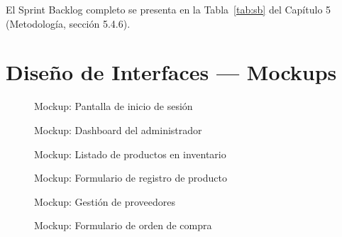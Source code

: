 \documentclass[12pt, letterpaper]{report}
\begin{document}
El Sprint Backlog completo se presenta en la Tabla~\ref{tab:sb} del Capítulo 5 (Metodología, sección 5.4.6).

\chapter{Diseño de Interfaces --- Mockups}

\begin{figure}[H]
\centering
{}
\caption{Mockup: Pantalla de inicio de sesión}
\end{figure}

\begin{figure}[H]
\centering
{}
\caption{Mockup: Dashboard del administrador}
\end{figure}

\begin{figure}[H]
\centering
{}
\caption{Mockup: Listado de productos en inventario}
\end{figure}

\begin{figure}[H]
\centering
{}
\caption{Mockup: Formulario de registro de producto}
\end{figure}

\begin{figure}[H]
\centering
{}
\caption{Mockup: Gestión de proveedores}
\end{figure}

\begin{figure}[H]
\centering
{}
\caption{Mockup: Formulario de orden de compra}
\end{figure}
\end{document}
